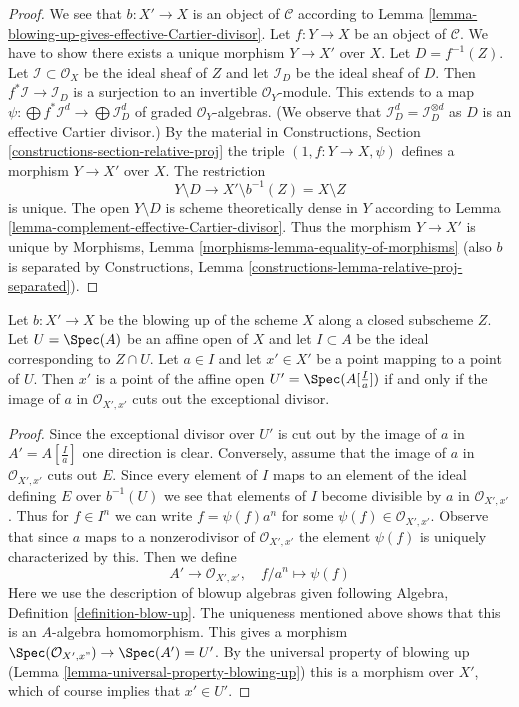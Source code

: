 \begin{proof}
We see that $b : X' \to X$ is an object of $\mathcal{C}$ according to
Lemma \ref{lemma-blowing-up-gives-effective-Cartier-divisor}.
Let $f : Y \to X$ be an object of $\mathcal{C}$. We have to show there exists
a unique morphism $Y \to X'$ over $X$. Let $D = f^{-1}(Z)$.
Let $\mathcal{I} \subset \mathcal{O}_X$ be the ideal sheaf of $Z$
and let $\mathcal{I}_D$ be the ideal sheaf of $D$. Then
$f^*\mathcal{I} \to \mathcal{I}_D$ is a surjection
to an invertible $\mathcal{O}_Y$-module. This extends to a map
$\psi : \bigoplus f^*\mathcal{I}^d \to \bigoplus \mathcal{I}_D^d$
of graded $\mathcal{O}_Y$-algebras. (We observe that
$\mathcal{I}_D^d = \mathcal{I}_D^{\otimes d}$ as $D$ is an
effective Cartier divisor.) By the material in
Constructions, Section \ref{constructions-section-relative-proj}
the triple $(1, f : Y \to X, \psi)$ defines a morphism $Y \to X'$ over $X$.
The restriction
$$
Y \setminus D \longrightarrow X' \setminus b^{-1}(Z) = X \setminus Z
$$
is unique. The open $Y \setminus D$ is scheme theoretically dense in $Y$
according to Lemma \ref{lemma-complement-effective-Cartier-divisor}.
Thus the morphism $Y \to X'$ is unique by
Morphisms, Lemma \ref{morphisms-lemma-equality-of-morphisms}
(also $b$ is separated by Constructions, Lemma
\ref{constructions-lemma-relative-proj-separated}).
\end{proof}

\begin{lemma}
\label{lemma-characterize-affine-blowup}
Let $b : X' \to X$ be the blowing up of the scheme $X$ along a closed
subscheme $Z$. Let $U = \Spec(A)$ be an affine open of $X$ and let
$I \subset A$ be the ideal corresponding to $Z \cap U$.
Let $a \in I$ and let $x' \in X'$ be a point mapping to a point of $U$.
Then $x'$ is a point of the affine open $U' = \Spec(A[\frac{I}{a}])$
if and only if the image of $a$ in $\mathcal{O}_{X', x'}$ cuts
out the exceptional divisor.
\end{lemma}

\begin{proof}
Since the exceptional divisor over $U'$ is cut out by the image of
$a$ in $A' = A[\frac{I}{a}]$ one direction is clear. Conversely, assume
that the image of $a$ in $\mathcal{O}_{X', x'}$ cuts out $E$.
Since every element of $I$ maps to an element of the ideal
defining $E$ over $b^{-1}(U)$ we see that elements of $I$ become
divisible by $a$ in $\mathcal{O}_{X', x'}$. Thus for $f \in I^n$
we can write $f = \psi(f) a^n$ for some $\psi(f) \in \mathcal{O}_{X', x'}$.
Observe that since $a$ maps to a nonzerodivisor of $\mathcal{O}_{X', x'}$
the element $\psi(f)$ is uniquely characterized by this. Then we
define
$$
A' \longrightarrow \mathcal{O}_{X', x'},\quad
f/a^n \longmapsto \psi(f)
$$
Here we use the description of blowup algebras given following
Algebra, Definition \ref{definition-blow-up}. The uniqueness mentioned
above shows that this is an $A$-algebra homomorphism.
This gives a morphism $\Spec(\mathcal{O}_{X', x"}) \to \Spec(A') = U'$.
By the universal property of blowing up
(Lemma \ref{lemma-universal-property-blowing-up})
this is a morphism over
$X'$, which of course implies that $x' \in U'$.
\end{proof}

